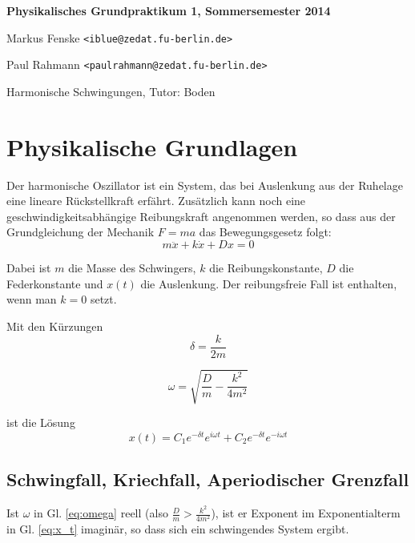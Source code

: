 \documentclass[a4paper,german,12pt,smallheadings]{scrartcl}
\begin{document}
\begin{titlepage}

\end{titlepage}

\allowdisplaybreaks %
\begin{center}
\bfseries %
\sffamily %
\vspace{-40pt}
Physikalisches Grundpraktikum 1, Sommersemester 2014

Markus Fenske \texttt{<iblue@zedat.fu-berlin.de>}

Paul Rahmann \texttt{<paulrahmann@zedat.fu-berlin.de>}

Harmonische Schwingungen, Tutor: Boden
\vspace{-10pt}
\end{center}

\section{Physikalische Grundlagen}
Der harmonische Oszillator ist ein System, das bei Auslenkung aus der Ruhelage
eine lineare Rückstellkraft erfährt. Zusätzlich kann noch eine
geschwindigkeitsabhängige Reibungskraft angenommen werden, so dass aus der
Grundgleichung der Mechanik $F=ma$ das Bewegungsgesetz folgt:
\begin{equation}
  m \ddot{x} + k \dot{x} + D x = 0
\end{equation}

Dabei ist $m$ die Masse des Schwingers, $k$ die Reibungskonstante, $D$ die
Federkonstante und $x(t)$ die Auslenkung. Der reibungsfreie Fall ist enthalten,
wenn man $k=0$ setzt.

Mit den Kürzungen
\begin{equation}
  \delta = \frac{k}{2m}
  \label{eq:delta}
\end{equation}

\begin{equation}
  \omega = \sqrt{\frac{D}{m} - \frac{k^2}{4m^2}}
  \label{eq:omega}
\end{equation}

ist die Lösung
\begin{equation}
  x(t) = C_1 e^{- \delta t} e^{i \omega t} + C_2 e^{-\delta t} e^{-i \omega t}
  \label{eq:x_t}
\end{equation}

\subsection{Schwingfall, Kriechfall, Aperiodischer Grenzfall}
Ist $\omega$ in Gl. \ref{eq:omega} reell (also $\frac{D}{m} >
\frac{k^2}{4m^2}$), ist er Exponent im Exponentialterm in Gl. \ref{eq:x_t}
imaginär, so dass sich ein schwingendes System ergibt.
\end{document}
